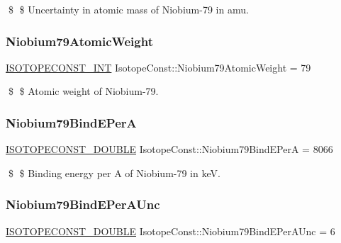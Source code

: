 \$ \$ Uncertainty in atomic mass of Niobium-\/79 in amu. \mbox{\label{group___isotope_const-_niobium-_nb79_ga87bc2309d09242d89cc01ec61a09d56f}} 
\subsubsection{\texorpdfstring{Niobium79\+Atomic\+Weight}{Niobium79AtomicWeight}}
{\footnotesize\ttfamily \mbox{\hyperlink{group___isotope_const-_macros_ga5f18360b3e99483a35c32d789e62621c}{I\+S\+O\+T\+O\+P\+E\+C\+O\+N\+S\+T\+\_\+\+I\+NT}} Isotope\+Const\+::\+Niobium79\+Atomic\+Weight = 79}

\$ \$ Atomic weight of Niobium-\/79. \mbox{\label{group___isotope_const-_niobium-_nb79_ga5eb8c4735bc2dbc72ed787b8e2724726}} 
\subsubsection{\texorpdfstring{Niobium79\+Bind\+E\+PerA}{Niobium79BindEPerA}}
{\footnotesize\ttfamily \mbox{\hyperlink{group___isotope_const-_macros_ga8f45a7272ce02c0b4c65c44636ed719a}{I\+S\+O\+T\+O\+P\+E\+C\+O\+N\+S\+T\+\_\+\+D\+O\+U\+B\+LE}} Isotope\+Const\+::\+Niobium79\+Bind\+E\+PerA = 8066}

\$ \$ Binding energy per A of Niobium-\/79 in keV. \mbox{\label{group___isotope_const-_niobium-_nb79_ga0e8e2b462a30aef721b558abf1ef7574}} 
\subsubsection{\texorpdfstring{Niobium79\+Bind\+E\+Per\+A\+Unc}{Niobium79BindEPerAUnc}}
{\footnotesize\ttfamily \mbox{\hyperlink{group___isotope_const-_macros_ga8f45a7272ce02c0b4c65c44636ed719a}{I\+S\+O\+T\+O\+P\+E\+C\+O\+N\+S\+T\+\_\+\+D\+O\+U\+B\+LE}} Isotope\+Const\+::\+Niobium79\+Bind\+E\+Per\+A\+Unc = 6}

